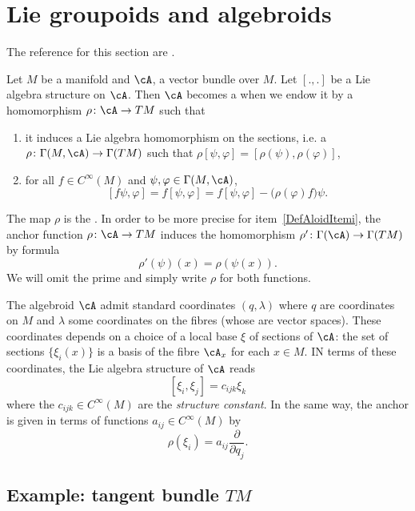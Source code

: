 \section{Lie groupoids and algebroids}
The reference for this section are \cite{WeinGroupoids,WeinGpoidsSymple}.

Let $M$ be a manifold and $\cA$, a vector bundle over $M$. Let $[.,.]$ be a Lie algebra structure on $\cA$. Then $\cA$ becomes a  when we endow it by a homomorphism $\rho\colon \cA\to TM$ such that
\begin{enumerate}
\item\label{DefAloidItemi} it induces a Lie algebra homomorphism on the sections, i.e. a $\rho\colon \Gamma(M,\cA)\to \Gamma(TM)$ such that $\rho[\psi,\varphi]=[\rho(\psi),\rho(\varphi)]$,
\item for all $f\in C^{\infty}(M)$ and $\psi,\varphi\in\Gamma(M,\cA)$,
\begin{equation}  \label{DefAlgoidCondc}
[f\psi,\varphi]=f[\psi,\varphi]=f[\psi,\varphi]-\big( \rho(\varphi)f \big)\psi.
\end{equation}

\end{enumerate}
The map $\rho$ is the . In order to be more precise for item~\ref{DefAloidItemi}, the anchor function $\rho\colon \cA\to TM$ induces the homomorphism  $\rho'\colon \Gamma(\cA)\to \Gamma(TM)$ by formula
\begin{equation}  \label{EqInduitAncra}
  \rho'(\psi)(x)=\rho(\psi(x)).
\end{equation}
We will omit the prime and simply write $\rho$ for both functions.

The algebroid $\cA$ admit standard coordinates\label{PgStandCoord} $(q,\lambda)$ where $q$ are coordinates on $M$ and $\lambda$ some coordinates on the fibres (whose are vector spaces). These coordinates depends on a choice of a local base $\xi$ of sections of $\cA$: the set of sections $\{\xi_{i}(x)\}$ is a basis of the fibre $\cA_{x}$ for each $x\in M$. IN terms of these coordinates, the Lie algebra structure of $\cA$ reads
\[
  [\xi_{i},\xi_{j}]=c_{ijk}\xi_{k}
\]
where the $c_{ijk}\in C^{\infty}(M)$ are the \emph{structure constant}. In the same way, the anchor is given in terms of functions $a_{ij}\in C^{\infty}(M)$ by
\[
  \rho(\xi_{i})=a_{ij}\frac{ \partial }{ \partial q_{j} }.
\]

\subsection{Example: tangent bundle \texorpdfstring{$TM$}{TM}}

